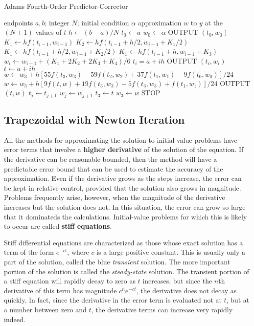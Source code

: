 \documentclass[preprint,12pt]{elsarticle}
\begin{document}
\begin{algorithm}
  \caption{Adams Fourth-Order Predictor-Corrector}
  \label{algo:multistep}
  \begin{algorithmic}[1]
  \Require endpoints $a,b$; integer $N$; initial condition $\alpha$
  \Ensure approximation $w$ to $y$ at the $(N+1)$ values of $t$
  \State $h\gets (b-a)/N$
  \State $t_0 \gets a$
  \State $w_0 \gets \alpha$
  \State OUTPUT $(t_0 , w_0)$
    \State $K_1 \gets hf(t_{i-1},w_{i-1})$
    \State $K_2 \gets hf(t_{i-1}+h/2,w_{i-1}+K_{1}/2)$
    \State $K_1 \gets hf(t_{i-1}+h/2,w_{i-1}+K_{2}/2)$
    \State $K_1 \gets hf(t_{i-1}+h,w_{i-1}+K_3)$
    \State $w_i \gets w_{i-1}+(K_{1}+2K_{2}+2K_{3}+K_{4})/6$
    \State $t_i = a + ih$
    \State OUTPUT $(t_i , w_i)$
  \EndFor
    \State $t\gets a+ih$
    \State $w\gets w_{3}+h[55f(t_{3},w_{3})-59f(t_{2},w_{2})+37f(t_{1},w_{1})-9f(t_{0},w_{0})]/24$
    \State $w\gets w_{3}+h[9f(t,w)+19f(t_{3},w_{3})-5f(t_{3},w_{3})+f(t_{1},w_{1})]/24$
    \State OUTPUT $(t,w)$
      \State $t_j \gets t_{j+1}$
      \State $w_j \gets w_{j+1}$
    \EndFor
    \State $t_3 \gets t$
    \State $w_3 \gets w$
  \EndFor
  \State STOP
  \end{algorithmic}
\end{algorithm}

\subsection{Trapezoidal with Newton Iteration}
\label{SS:2.3}

All the methods for approximating the solution to initial-value problems have error terms that involve a \textbf{higher derivative} of the solution of the equation. If the derivative can be reasonable bounded, then the method will have a predictable error bound that can be used to estimate the accuracy of the approximation. Even if the derivative grows as the steps increase, the error can be kept in relative control, provided that the solution also grows in magnitude. Problems frequently arise, however, when the magnitude of the derivative increases but the solution does not. In this situation, the error can grow so large that it dominateds the calculations. Initial-value problems for which this is likely to occur are called \textbf{stiff equations}.

Stiff differential equations are characterized as those whose exact solution has a term of the form $e^{-ct}$, where $c$ is a large positive constant. This is usually only a part of the solution, called the blue \textit{transient} solution. The more important portion of the solution is called the \textit{steady-state} solution. The transient portion of a stiff equation will rapidly decay to zero as $t$ increases, but since the $n$th derivative of this term has magnitude $c^n e^{-ct}$, the derivative does not decay as quickly. In fact, since the derivative in the error term is evaluated not at $t$, but at a number between zero and $t$, the derivative terms can increase very rapidly indeed.
\end{document}
